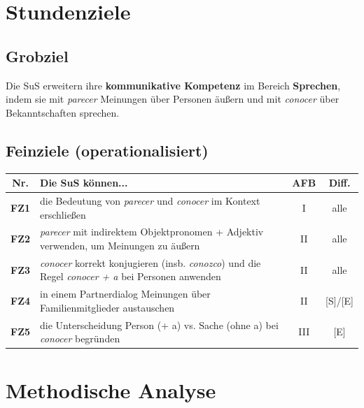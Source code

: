 \documentclass[11pt,a4paper]{article}
\begin{document}
\section{Stundenziele}

\subsection{Grobziel}
Die SuS erweitern ihre \textbf{kommunikative Kompetenz} im Bereich \textbf{Sprechen}, indem sie mit \textit{parecer} Meinungen über Personen äußern und mit \textit{conocer} über Bekanntschaften sprechen.

\subsection{Feinziele (operationalisiert)}

\begin{tabular}{|c|p{7cm}|c|c|}
\hline
\textbf{Nr.} & \textbf{Die SuS können...} & \textbf{AFB} & \textbf{Diff.} \\
\hline
\textbf{FZ1} & die Bedeutung von \textit{parecer} und \textit{conocer} im Kontext erschließen & I & alle \\
\hline
\textbf{FZ2} & \textit{parecer} mit indirektem Objektpronomen + Adjektiv verwenden, um Meinungen zu äußern & II & alle \\
\hline
\textbf{FZ3} & \textit{conocer} korrekt konjugieren (insb. \textit{conozco}) und die Regel \textit{conocer + a} bei Personen anwenden & II & alle \\
\hline
\textbf{FZ4} & in einem Partnerdialog Meinungen über Familienmitglieder austauschen & II & [S]/[E] \\
\hline
\textbf{FZ5} & die Unterscheidung Person (+ a) vs. Sache (ohne a) bei \textit{conocer} begründen & III & [E] \\
\hline
\end{tabular}

\section{Methodische Analyse}
\end{document}
